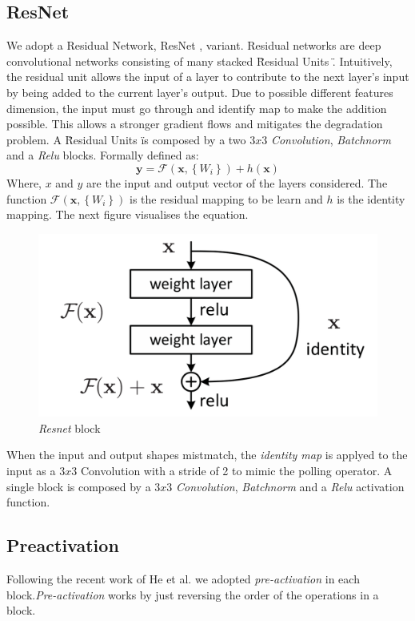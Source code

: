 \documentclass[../document.tex]{subfiles}
\begin{document}
\subsection{ResNet}
We adopt a Residual Network, ResNet \cite{he2015deep}, variant. Residual networks are deep convolutional networks consisting of many stacked \" Residual Units \". Intuitively, the residual unit allows the input of a layer to contribute to the next layer's input by being added to the current layer's output. Due to possible different features dimension, the input must go through and identify map to make the addition possible. This allows a stronger gradient flows and mitigates the degradation problem. A \"Residual Units \" is composed by a two $3x3$ \emph{Convolution}, \emph{Batchnorm} \cite{ioffe2015batch} and a \emph{Relu} blocks. Formally defined as: 
\begin{equation}
    \mathbf{y}=\mathcal{F}\left(\mathbf{x},\left\{W_{i}\right\}\right)+h(\mathbf{x})
    \label{eq : resnet}
\end{equation}
Where, $x$ and $y$ are the input and output vector of the layers considered. The function $\mathcal{F}\left(\mathbf{x},\left\{W_{i}\right\}\right)$ is the residual mapping to be learn and $h$ is the identity mapping. The next figure visualises the equation.
\begin{figure}[htbp]
    \centering
    \includegraphics[scale=0.3]{../img/implementation/estimator/resnet_block.png}
    \caption{\emph{Resnet} block \cite{he2015deep}}
\end{figure}
When the input and output shapes mistmatch, the \emph{identity map} is applyed to the input as a $3x3$ Convolution with a stride of 2 to mimic the polling operator. A single block is composed by a $3x3$ \emph{Convolution}, \emph{Batchnorm} and a \emph{Relu} activation function. 
\subsection{Preactivation}
Following the recent work of He et al. \cite{he2015identity} we adopted \emph{pre-activation} in each block.\emph{Pre-activation} works by just reversing the order of the operations in a block.
\end{document}
